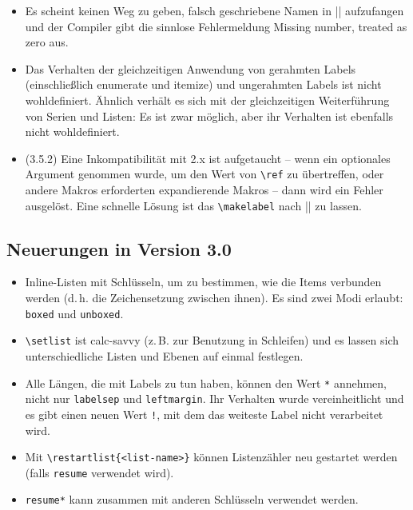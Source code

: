 \documentclass[a4paper,ngerman]{ltxguide}
\newcommand\0{\unskip\enspace\fbox{\fontsize{4}{4}\selectfont NEU 3.0}}
\newcommand\3{\unskip\enspace\fbox{\fontsize{4}{4}\selectfont NEW 3.0}}
\begin{document}
\begin{enumerate}[leftmargin=*]
\begin{enumerate}[leftmargin=\parindent]
\begin{enumerate}[labelindent=\parindent,|\allowbreak
| leftmargin=*,|\allowbreak| label=\Roman*.,|\allowbreak
| widest=IV,|\allowbreak| align=left]
\begin{enumerate}[label=\fbox{\arabic*}]
\begin{itemize}
\item Es scheint keinen Weg zu geben, falsch geschriebene Namen in |\setlist| aufzufangen und der Compiler gibt die 
sinnlose Fehlermeldung \glqq Missing number, treated as zero\grqq{} aus.

\item Das Verhalten der gleichzeitigen Anwendung von gerahmten Labels
(einschlie\ss lich \textsf{enumerate} und \textsf{itemize}) und ungerahmten Labels ist nicht wohldefiniert. 
\"Ahnlich verh\"alt es sich mit der gleichzeitigen Weiterf\"uhrung von
Serien und Listen: Es ist zwar m\"oglich, aber ihr Verhalten ist ebenfalls nicht wohldefiniert.

\item (3.5.2) Eine Inkompatibilit\"at mit 2.x ist aufgetaucht -- wenn ein
optionales Argument genommen wurde, um den Wert von
\verb|\ref| zu \"ubertreffen, oder andere Makros erforderten expandierende
Makros -- dann wird ein Fehler ausgel\"ost. Eine schnelle L\"osung ist das
\verb|\makelabel| nach |\descriptionlabel| zu lassen.

\end{itemize}
	
	\subsection{Neuerungen in Version 3.0}
	
\begin{itemize}
\item  Inline-Listen mit Schl\"usseln, um zu bestimmen, wie die Items
verbunden werden (d.\,h. die Zeichensetzung zwischen ihnen). Es sind zwei
Modi erlaubt: \verb|boxed| und \verb|unboxed|.

\item \verb|\setlist| ist \textsf{calc}-savvy (z.\,B. zur Benutzung in Schleifen) und es lassen sich unterschiedliche 
Listen und Ebenen auf einmal festlegen.

\item Alle L\"angen, die mit Labels zu tun haben, k\"onnen den Wert
\verb|*| annehmen, nicht nur \verb|labelsep| und \verb|leftmargin|. Ihr Verhalten wurde vereinheitlicht und es gibt einen 
neuen Wert \verb|!|, mit dem das weiteste Label nicht verarbeitet wird.

\item Mit \verb|\restartlist{<list-name>}| k\"onnen Listenz\"ahler neu
gestartet werden (falls \verb|resume| verwendet wird).

\item \verb|resume*| kann zusammen mit anderen Schl\"usseln verwendet werden.


\end{itemize}
\end{enumerate}
\end{enumerate}
\end{enumerate}
\end{enumerate}
\end{document}
